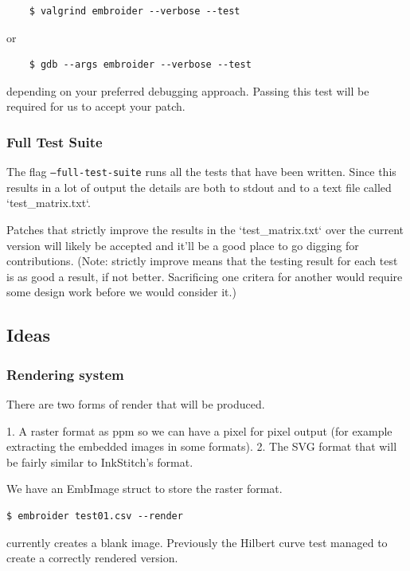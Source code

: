 \documentclass[a4paper, 11pt]{report}
\begin{document}
\begin{verbatim}
    $ valgrind embroider --verbose --test
  \end{verbatim}

or

\begin{verbatim}
    $ gdb --args embroider --verbose --test
  \end{verbatim}

depending on your preferred debugging approach. Passing this test
will be required for us to accept your patch.

\subsubsection{Full Test Suite}

The flag \texttt{--full-test-suite} runs all the tests that have been written.
Since this results in a lot of output the details are both to stdout
and to a text file called `test\_matrix.txt`.

Patches that strictly improve the results in the `test\_matrix.txt` over
the current version will likely be accepted and it'll be a good place
to go digging for contributions. (Note: strictly improve means that
the testing result for each test is as good a result, if not better.
Sacrificing one critera for another would require some design work
before we would consider it.)

\subsection{Ideas}

\subsubsection{Rendering system}

There are two forms of render that will be produced.

1. A raster format as ppm so we can have a pixel for pixel output (for example extracting the embedded images in some formats).
2. The SVG format that will be fairly similar to InkStitch's format.

We have an EmbImage struct to store the raster format.

\begin{verbatim}
$ embroider test01.csv --render
\end{verbatim}

currently creates a blank image. Previously the Hilbert curve test managed to
create a correctly rendered version.
\end{document}
